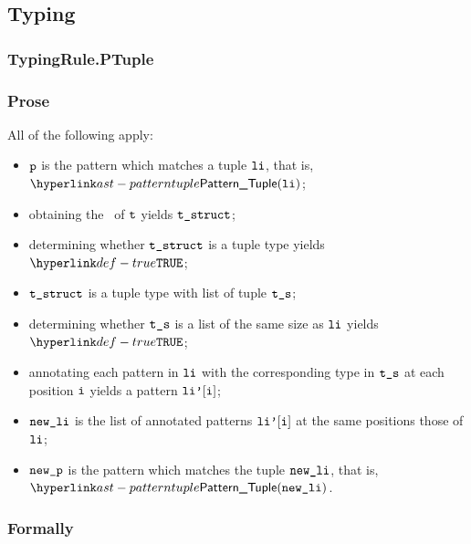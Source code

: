 \subsection{Typing}
\subsubsection{TypingRule.PTuple\label{sec:TypingRule.PTuple}}
\subsubsection{Prose}
All of the following apply:
  \begin{itemize}
  \item $\vp$ is the pattern which matches a tuple $\vli$, that is, $\PatternTuple(\vli)$;
  \item obtaining the \structure\ of $\vt$ yields $\vtstruct$\ProseOrTypeError;
  \item determining whether $\vtstruct$ is a tuple type yields $\True$\ProseOrTypeError;
  \item $\vtstruct$ is a tuple type with list of tuple $\vts$;
  \item determining whether $\vts$ is a list of the same size as $\vli$ yields $\True$\ProseOrTypeError;
  \item annotating each pattern in $\vli$ with the corresponding type in $\vts$ at each position $\vi$
        yields a pattern $\vlip[\vi]$\ProseOrTypeError;
  \item $\newli$ is the list of annotated patterns $\vlip[\vi]$ at the same positions those of $\vli$;
  \item $\newp$ is the pattern which matches the tuple $\newli$, that is, $\PatternTuple(\newli)$.
  \end{itemize}
\subsubsection{Formally}
\begin{mathpar}
\end{mathpar}

